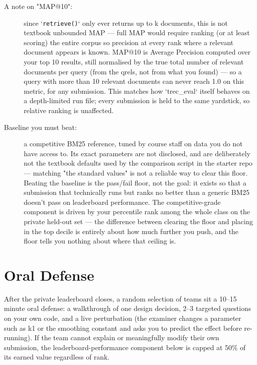 \documentclass[10pt]{article}
\begin{document}
\begin{description}
\item[A note on "MAP@10":] since `\texttt{retrieve()}` only ever returns up to k documents, this is not textbook unbounded MAP — full MAP would require ranking (or at least scoring) the entire corpus so precision at every rank where a relevant document appears is known. MAP@10 is Average Precision computed over your top 10 results, still normalised by the true total number of relevant documents per query (from the qrels, not from what you found) — so a query with more than 10 relevant documents can never reach 1.0 on this metric, for any submission. This matches how `trec\_eval` itself behaves on a depth-limited run file; every submission is held to the same yardstick, so relative ranking is unaffected.
\item[Baseline you must beat:] a competitive BM25 reference, tuned by course staff on data you do not have access to. Its exact parameters are not disclosed, and are deliberately not the textbook defaults used by the comparison script in the starter repo — matching "the standard values" is not a reliable way to clear this floor. Beating the baseline is the pass/fail floor, not the goal: it exists so that a submission that technically runs but ranks no better than a generic BM25 doesn't pass on leaderboard performance. The competitive-grade component is driven by your percentile rank among the whole class on the private held-out set — the difference between clearing the floor and placing in the top decile is entirely about how much further you push, and the floor tells you nothing about where that ceiling is.
\end{description}


\section{Oral Defense}
After the private leaderboard closes, a random selection of teams sit a 10–15 minute oral defense: a walkthrough of one design decision, 2–3 targeted questions on your own code, and a live perturbation (the examiner changes a parameter such as k1 or the smoothing constant and asks you to predict the effect before re-running). If the team cannot explain or meaningfully modify their own submission, the leaderboard-performance component below is capped at 50\% of its earned value regardless of rank.
\end{document}
